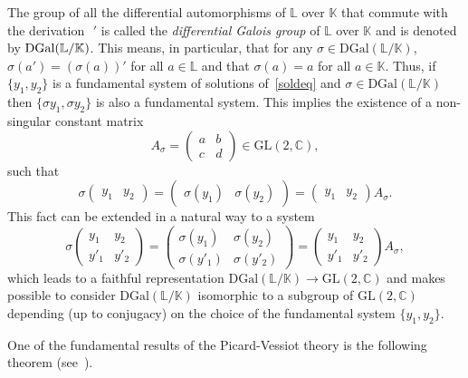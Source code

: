 \documentclass[final]{siamart0516}
\begin{document}
    The group of all the differential automorphisms of $\mathbb{L}$ over $\mathbb{K}$
    that commute with the derivation $\phantom{i}'$  is called the
    \emph{differential Galois group} of $\mathbb{L}$ over $\mathbb{K}$ and is denoted by ${\rm
         DGal}(\mathbb{L}/\mathbb{K})$. This means, in particular, that for any $\sigma\in
    \mathrm{DGal}(\mathbb{L}/\mathbb{K})$, $\sigma(a')=(\sigma(a))'$ for all $a\in \mathbb{L}$
    and that $\sigma(a)=a$ for all $a\in \mathbb{K}$. Thus, if $\{y_1,y_2\}$ is
    a fundamental system of solutions of~\eqref{soldeq} and $\sigma \in
    \mathrm{DGal}(\mathbb{L}/\mathbb{K})$ then $\{\sigma y_1, \sigma y_2\}$ is also a
    fundamental system. This implies the existence of a non-singular
    constant matrix
    \[
    A_\sigma=
    \begin{pmatrix}
    a & b\\
    c & d
    \end{pmatrix}
    \in \mathrm{GL}(2,\mathbb{C}),
    \]
    such that
    \[
    \sigma
    \begin{pmatrix}
    y_{1}&
    y_{2}
    \end{pmatrix}
    =
    \begin{pmatrix}
    \sigma (y_{1})&
    \sigma (y_{2})
    \end{pmatrix}
    =\begin{pmatrix} y_{1}& y_{2}
    \end{pmatrix}A_\sigma.
    \]
    This fact can be extended in a natural way to a system
    \[
    \sigma
    \begin{pmatrix}
    y_{1}&y_2\\
    y'_1&y'_{2}
    \end{pmatrix}
    =
    \begin{pmatrix}
    \sigma (y_{1})&\sigma (y_2)\\
    \sigma (y'_1)&\sigma (y'_{2})
    \end{pmatrix}
    =\begin{pmatrix} y_{1}& y_{2}\\y'_1&y'_2
    \end{pmatrix}A_\sigma,
    \]
    which leads to a faithful representation $\mathrm{DGal}(\mathbb{L}/\mathbb{K})\to
    \mathrm{GL}(2,\mathbb{C})$ and makes possible to consider
    $\mathrm{DGal}(\mathbb{L}/\mathbb{K})$ isomorphic to a subgroup of $\mathrm{GL}(2,\mathbb{C})$
    depending (up to conjugacy) on the choice of the fundamental system $\{y_1,y_2\}$.
    
    One of the fundamental results of the Picard-Vessiot theory is the
    following theorem (see~\cite{ka,kol}).
    
\end{document}
